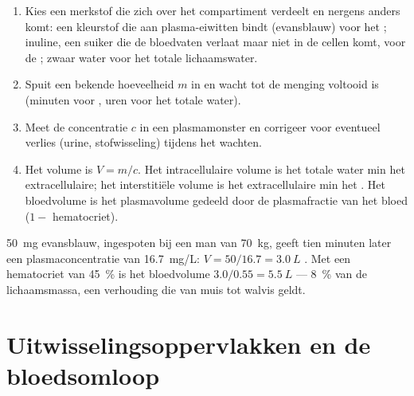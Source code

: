 \begin{method}\label{met:b1:mammal-organization:dilution}
\begin{enumerate}
  \item Kies een merkstof die zich over het compartiment verdeelt en
        nergens anders komt: een kleurstof die aan plasma-eiwitten bindt
        (evansblauw) voor het ; inuline, een suiker die de bloedvaten
        verlaat maar niet in de cellen komt, voor de ; zwaar water voor het totale lichaamswater.
  \item Spuit een bekende hoeveelheid $m$ in en wacht tot de menging
        voltooid is (minuten voor , uren voor het totale water).
  \item Meet de concentratie $c$ in een plasmamonster en corrigeer voor
        eventueel verlies (urine, stofwisseling) tijdens het wachten.
  \item Het volume is $V = m/c$. Het intracellulaire volume is het totale
        water min het extracellulaire; het interstitiële volume is het
        extracellulaire min het . Het bloedvolume is het
        plasmavolume gedeeld door de plasmafractie van het bloed
        ($1 - $ hematocriet).
\end{enumerate}
\end{method}

\begin{example}\label{ex:b1:mammal-organization:evansblue}
\qty{50}{mg} evansblauw, ingespoten bij een man van \qty{70}{kg}, geeft tien
minuten later een plasmaconcentratie van \qty{16.7}{mg/L}:
$V = 50/16.7 = \qty{3.0}{L}$ . Met een hematocriet van \qty{45}{\%} is
het bloedvolume $3.0/0.55 = \qty{5.5}{L}$ --- \qty{8}{\%} van de
lichaamsmassa, een verhouding die van muis tot walvis geldt.
\end{example}

\section{Uitwisselingsoppervlakken en de bloedsomloop}

